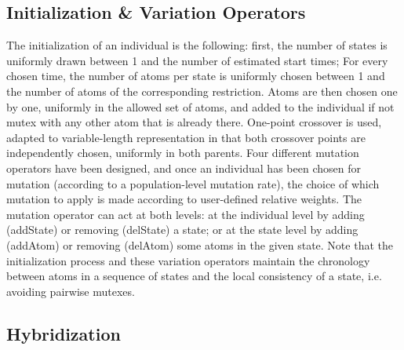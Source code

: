 \documentclass{llncs}
\begin{document}
\subsection{Initialization \& Variation Operators }
The initialization of an individual is the following: first, the number of states is uniformly drawn between 1 and the number of estimated start times; For every chosen time, the number of atoms per state is uniformly chosen between 1 and the number of atoms of the corresponding restriction.
Atoms are then chosen one by one, uniformly in the allowed set of atoms, and added to the individual if not mutex with any other atom that is already there.
One-point crossover is used, adapted to variable-length representation in that both crossover points are independently chosen, uniformly in both parents.
Four different mutation operators have been designed, and once an individual has been chosen for mutation (according to a population-level mutation rate),
the choice of which mutation to apply is made according to user-defined relative weights.
The mutation operator can act at both levels: at the individual level by adding (addState) or removing (delState) a state; or at the state level by adding (addAtom) or removing (delAtom) some atoms in the given
state. Note that the initialization process and these variation operators maintain the chronology between atoms in a sequence of states and the local consistency 
of a state, i.e. avoiding pairwise mutexes.
\subsection{Hybridization}
\end{document}
